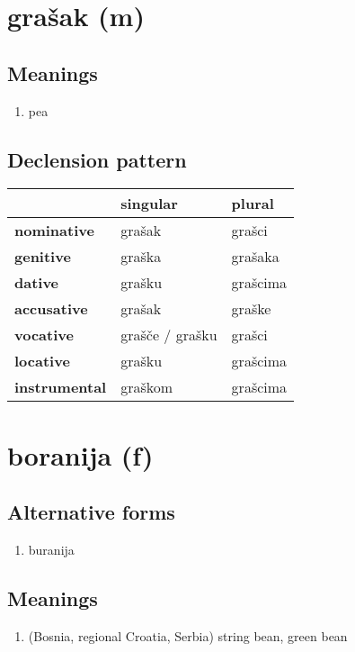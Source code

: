 \filbreak
\section{grašak (m)}
\subsection*{Meanings}
\begin{enumerate}
\item pea
\end{enumerate}
\subsection*{Declension pattern}
\begin{tabularx}{\linewidth}{Xll}
\toprule
{} &         singular &    plural \\
\midrule
\textbf{nominative  } &           grašak &    grašci \\
\textbf{genitive    } &           graška &   grašaka \\
\textbf{dative      } &           grašku &  grašcima \\
\textbf{accusative  } &           grašak &    graške \\
\textbf{vocative    } &  grašče / grašku &    grašci \\
\textbf{locative    } &           grašku &  grašcima \\
\textbf{instrumental} &          graškom &  grašcima \\
\bottomrule
\end{tabularx}

\filbreak
\section{boranija (f)}
\subsection*{Alternative forms}
\begin{enumerate}
\item buranija
\end{enumerate}
\subsection*{Meanings}
\begin{enumerate}
\item (Bosnia, regional Croatia, Serbia) string bean, green bean
\end{enumerate}
